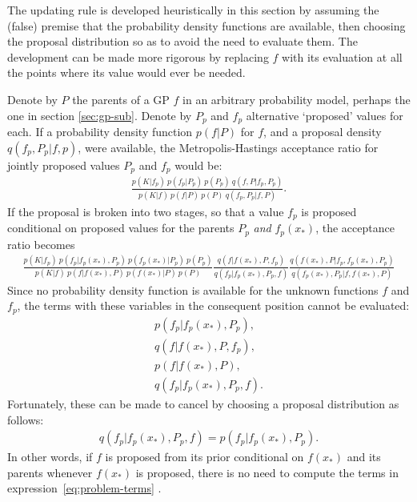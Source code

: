 \documentclass[article]{jss}
\begin{document}
The updating rule is developed heuristically in this section by assuming the (false) premise that the probability density functions are available, then choosing the proposal distribution so as to avoid the need to evaluate them. The development can be made more rigorous by replacing $f$ with its evaluation at all the points where its value would ever be needed.

Denote by $P$ the parents of a GP $f$ in an arbitrary probability model, perhaps the one in section \ref{sec:gp-sub}. Denote by $P_p$ and $f_p$ alternative `proposed' values for each. If a probability density function $p(f|P)$ for $f$, and a proposal density $q(f_p,P_p|f,p)$, were available, the Metropolis-Hastings acceptance ratio for jointly proposed values $P_p$ and $f_p$ would be:
\begin{eqnarray*}
    \frac{p(K|f_p)\ p(f_p|P_p)\ p(P_p)\ q(f,P|f_p,P_p)}{p(K|f)\ p(f|P)\ p(P)\ q(f_p,P_p|f,P)}.
\end{eqnarray*}
If the proposal is broken into two stages, so that a value $f_p$ is proposed conditional on proposed values for the parents $P_p$ \emph{and} $f_p(x_*)$, the acceptance ratio becomes
\begin{eqnarray*}
    \frac{p(K|f_p)\ p(f_p|f_p(x_*), P_p)\ p(f_p(x_*) | P_p)\ p(P_p)}{p(K|f)\ p(f|f(x_*), P)\ p(f(x_*) | P)\ p(P)}
    \frac{q(f|f(x_*),P,f_p)  }{q(f_p|f_p(x_*),P_p,f)}
    \frac{q(f(x_*),P|f_p,f_p(x_*),P_p)}{q(f_p(x_*),P_p|f,f(x_*), P)}
\end{eqnarray*}
Since no probability density function is available for the unknown functions $f$ and $f_p$, the terms with these variables in the consequent position cannot be evaluated:
\begin{equation}
    \label{eq:problem-terms} 
    \begin{array}{r}
        p(f_p|f_p(x_*), P_p),\\ q(f|f(x_*),P,f_p),\\ p(f|f(x_*), P),\\ q(f_p|f_p(x_*), P_p, f).
    \end{array}
\end{equation}
Fortunately, these can be made to cancel by choosing a proposal distribution as follows:
\begin{eqnarray*}
    q(f_p|f_p(x_*),P_p,f) = p(f_p|f_p(x_*), P_p).
\end{eqnarray*}
In other words, if $f$ is proposed from its prior conditional on $f(x_*)$ and its parents whenever $f(x_*)$ is proposed, there is no need to compute the terms in expression~\ref{eq:problem-terms} .
\end{document}
